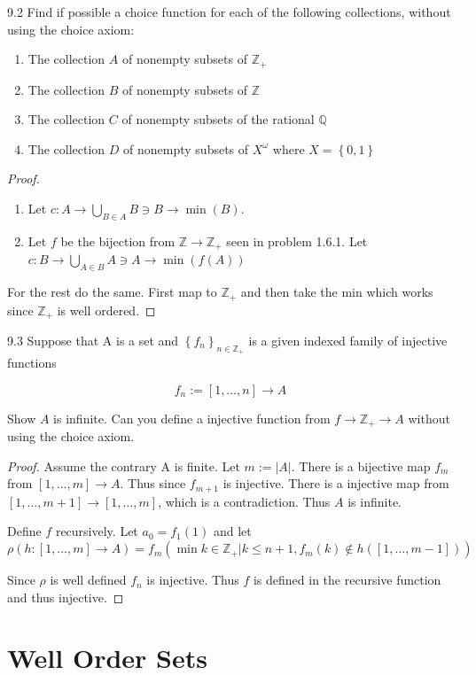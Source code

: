 \documentclass{article}
\newcommand{\Q}{\mathbb{Q}}
\newcommand{\Z}{\mathbb{Z}}
\newcommand{\abs}[1]{\left\lvert #1\right\rvert}
\begin{document}
\begin{PROB}{9.2}\label{Problem 9.2.}
    Find if possible a choice function for each of the following collections, without using the choice axiom:
    \begin{enumerate}
        \item The collection $A$ of nonempty subsets of $\Z_+$
        \item The collection $B$ of nonempty subsets of $\Z$
        \item The collection $C$ of nonempty subsets of the rational $\Q$
        \item The collection $D$ of nonempty subsets of $X^\omega$ where $X = \left\{ 0, 1 \right\}$
    \end{enumerate}
\end{PROB}
\begin{proof}
    \begin{enumerate}
        \item Let $c : A \to \bigcup_{B \in A} B \ni B \to \min(B)$.
        \item Let $f$ be the bijection from $\Z \to \Z_+$ seen in problem 1.6.1. Let $c : B \to \bigcup_{A \in B} A \ni A \to \min(f(A))$      
    \end{enumerate}

    For the rest do the same. First map to $\Z_+$ and then take the min which works since $\Z_+$ is well ordered.  
\end{proof}

\bigskip

\begin{PROB}{9.3}\label{Problem 9.3.}
    Suppose that A is a set and $\left\{ f_n \right\}_{n \in \Z_+}$ is a given indexed family of injective functions

    \[
        f_n := [1, \dots, n] \to A
    \]
    
    Show $A$ is infinite. Can you define a injective function from $f \to \Z_+ \to A$ without using the choice axiom.   
\end{PROB}
\begin{proof}
    Assume the contrary A is finite. Let $m := \abs{A}$. There is a bijective map $f_{m}$ from $ [1, \dots, m]\to A$. Thus since $f_{m + 1}$ is injective. There is a injective map from $[1, \dots, m+1] \to [1, \dots, m]$, which is a contradiction. Thus $A$ is infinite.
    
    Define $f$ recursively. Let $a_0 = f_1(1)$ and let 
    \[\rho(h : [1, \dots, m] \to A) = f_{m}(\min{k \in \Z_+ | k \leq n + 1, f_{m}(k) \not \in h([1, \dots, m - 1])})\] 

    Since $\rho$ is well defined $f_{n}$ is injective. Thus $f$ is defined in the recursive function and thus injective.    
\end{proof}

\bigskip

\section*{Well Order Sets}
\end{document}
